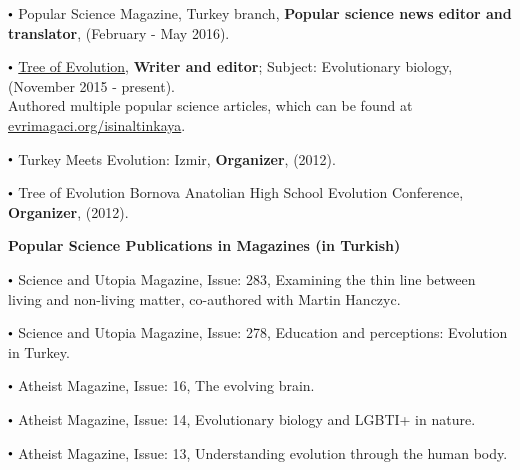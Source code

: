 \documentclass[letterpaper,10.5pt]{article}
\newcommand\sbullet[1][.5]{\mathbin{\vcenter{\hbox{\scalebox{#1}{$\bullet$}}}}}
\begin{document}
$\sbullet[.6]$ \hspace{0.74cm}  Popular Science Magazine, Turkey branch, \textbf{Popular science news editor and translator}, (February - May 2016). \\
\smallskip

$\sbullet[.6]$ \hspace{0.74cm}  \href{https://evrimagaci.org/isinaltinkaya/}{Tree of Evolution}, \textbf{Writer and editor}; Subject: Evolutionary biology, (November 2015 - present).\\
Authored multiple popular science articles, which can be found at \href{https://evrimagaci.org/isinaltinkaya/}{evrimagaci.org/isinaltinkaya}.

\smallskip

$\sbullet[.6]$ \hspace{0.74cm}  Turkey Meets Evolution: Izmir, \textbf{Organizer}, (2012). \\
\smallskip

$\sbullet[.6]$ \hspace{0.74cm}  Tree of Evolution Bornova Anatolian High School Evolution Conference, \textbf{Organizer}, (2012). \\
\smallskip

\textbf{Popular Science Publications in Magazines (in Turkish)}


\medskip

$\sbullet[.6]$ \hspace{0.74cm}  Science and Utopia Magazine, Issue: 283, Examining the thin line between living and non-living matter, co-authored with Martin Hanczyc.\\
\smallskip

$\sbullet[.6]$ \hspace{0.74cm}  Science and Utopia Magazine, Issue: 278, Education and perceptions: Evolution in Turkey. \\
\smallskip

$\sbullet[.6]$ \hspace{0.74cm}  Atheist Magazine, Issue: 16, The evolving brain. \\
\smallskip

$\sbullet[.6]$ \hspace{0.74cm}  Atheist Magazine, Issue: 14, Evolutionary biology and LGBTI+ in nature. \\
\smallskip

$\sbullet[.6]$ \hspace{0.74cm}  Atheist Magazine, Issue: 13, Understanding evolution through the human body. \\
\smallskip
\end{document}
